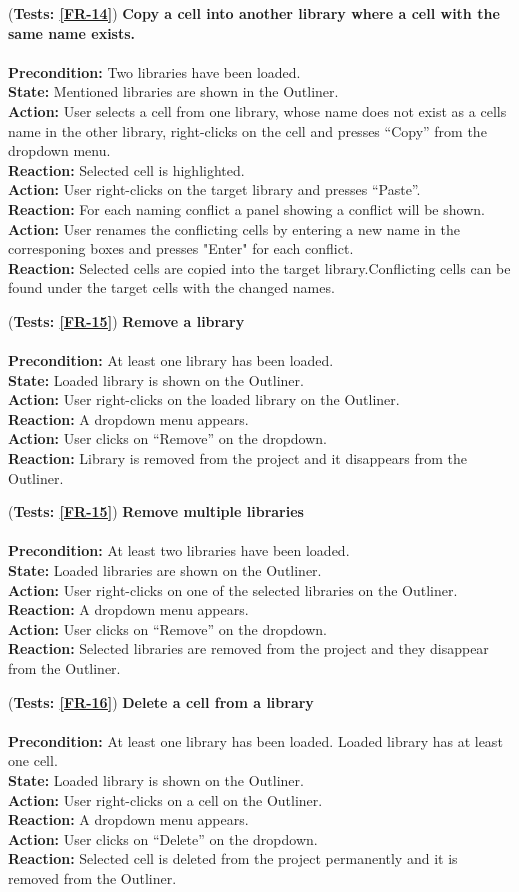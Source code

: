 \documentclass[10pt,a4paper]{report}
\newcommand{\precondition}[1]{
    \textbf{Precondition: } #1 \leavevmode \\
}
\newcommand{\action}[1]{
    \textbf{Action: } #1 \leavevmode \\
}
\newcommand{\state}[1]{
    \textbf{State: } #1 \leavevmode \\
}
\newcommand{\reaction}[1]{
    \textbf{Reaction: } #1 \leavevmode \\
}
\newcommand{\GTCDescription}[2]{
    (\textbf{Tests: #1}) \textbf{#2} \leavevmode \\
}
\begin{document}
\begin{GTC}
    \item \GTCDescription{\ref{FR-14}}
    {Copy a cell into another library where a cell with the same name exists.} \leavevmode \\ 
        \precondition{Two libraries have been loaded.}
        \state{Mentioned libraries are shown in the Outliner.}
        \action{User selects a cell from one library, whose name does not exist as a cells name in the other library,  right-clicks on the cell and presses “Copy” from the dropdown menu.}
        \reaction{Selected cell is highlighted.}
        \action{User right-clicks on the target library and presses “Paste”.}
        \reaction{For each naming conflict a panel showing a conflict will be shown.}
        \action{User renames the conflicting cells by entering a new name in the corresponing boxes and presses "Enter" for each conflict.}
        \reaction{Selected cells are copied into the target library.Conflicting cells can be found under the target cells with the changed names.}\label{GTC-33}
        
    \item \GTCDescription{\ref{FR-15}}
    {Remove a library} \leavevmode \\ 
        \precondition{At least one library has been loaded.}
        \state{Loaded library is shown on the Outliner.}
        \action{User right-clicks on the loaded library on the Outliner.}
        \reaction{A dropdown menu appears.}
        \action{User clicks on “Remove” on the dropdown.}
        \reaction{Library is removed from the project and it disappears from the Outliner.}\label{GTC-34}
        
       \item \GTCDescription{\ref{FR-15}}
    {Remove multiple libraries} \leavevmode \\ 
        \precondition{At least two libraries have been loaded.}
        \state{Loaded libraries are shown on the Outliner.}
        \action{User right-clicks on one of the selected libraries on the Outliner.}
        \reaction{A dropdown menu appears.}
        \action{User clicks on “Remove” on the dropdown.}
        \reaction{Selected libraries are removed from the project and they disappear from the Outliner.}\label{GTC-35}
    
    \item \GTCDescription{\ref{FR-16}}
    {Delete a cell from a library} \leavevmode \\ 
        \precondition{At least one library has been loaded. Loaded library has at least one cell.}
        \state{Loaded library is shown on the Outliner.}
        \action{User right-clicks on a cell on the Outliner.}
        \reaction{A dropdown menu appears.}
        \action{User clicks on “Delete” on the dropdown.}
        \reaction{Selected cell is deleted from the project permanently and it is removed from the Outliner.}\label{GTC-36}
    

\end{GTC}
\end{document}
